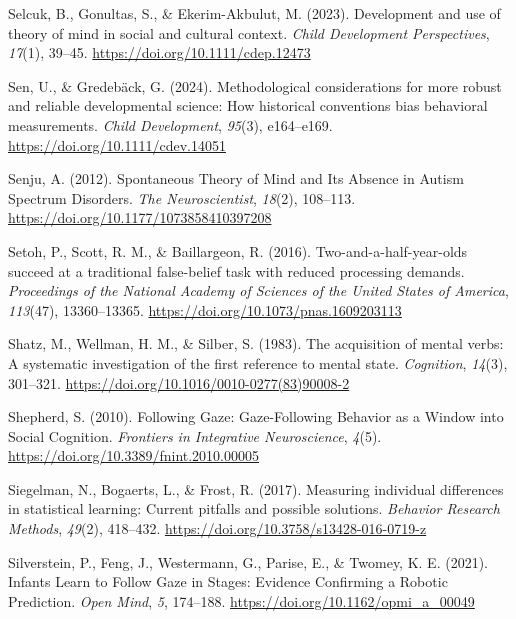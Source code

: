\documentclass[
]{scrbook}
\newlength{\cslhangindent}
\newenvironment{CSLReferences}[2] %
 {\begin{list}{}{%
  \setlength{\itemindent}{0pt}
  \setlength{\leftmargin}{0pt}
  \setlength{\parsep}{0pt}
  \ifodd #1
   \setlength{\leftmargin}{\cslhangindent}
   \setlength{\itemindent}{-1\cslhangindent}
  \fi
  \setlength{\itemsep}{#2\baselineskip}}}
 {\end{list}}
\begin{document}
\begin{CSLReferences}{1}{0}
Selcuk, B., Gonultas, S., \& Ekerim-Akbulut, M. (2023). Development and use of theory of mind in social and cultural context. \emph{Child Development Perspectives}, \emph{17}(1), 39--45. \url{https://doi.org/10.1111/cdep.12473}

Sen, U., \& Gredebäck, G. (2024). Methodological considerations for more robust and reliable developmental science: {How} historical conventions bias behavioral measurements. \emph{Child Development}, \emph{95}(3), e164--e169. \url{https://doi.org/10.1111/cdev.14051}

Senju, A. (2012). Spontaneous {Theory} of {Mind} and {Its Absence} in {Autism Spectrum Disorders}. \emph{The Neuroscientist}, \emph{18}(2), 108--113. \url{https://doi.org/10.1177/1073858410397208}

Setoh, P., Scott, R. M., \& Baillargeon, R. (2016). Two-and-a-half-year-olds succeed at a traditional false-belief task with reduced processing demands. \emph{Proceedings of the National Academy of Sciences of the United States of America}, \emph{113}(47), 13360--13365. \url{https://doi.org/10.1073/pnas.1609203113}

Shatz, M., Wellman, H. M., \& Silber, S. (1983). The acquisition of mental verbs: {A} systematic investigation of the first reference to mental state. \emph{Cognition}, \emph{14}(3), 301--321. \url{https://doi.org/10.1016/0010-0277(83)90008-2}

Shepherd, S. (2010). Following {Gaze}: {Gaze-Following Behavior} as a {Window} into {Social Cognition}. \emph{Frontiers in Integrative Neuroscience}, \emph{4}(5). \url{https://doi.org/10.3389/fnint.2010.00005}

Siegelman, N., Bogaerts, L., \& Frost, R. (2017). Measuring individual differences in statistical learning: {Current} pitfalls and possible solutions. \emph{Behavior Research Methods}, \emph{49}(2), 418--432. \url{https://doi.org/10.3758/s13428-016-0719-z}

Silverstein, P., Feng, J., Westermann, G., Parise, E., \& Twomey, K. E. (2021). Infants {Learn} to {Follow Gaze} in {Stages}: {Evidence Confirming} a {Robotic Prediction}. \emph{Open Mind}, \emph{5}, 174--188. \url{https://doi.org/10.1162/opmi_a_00049}


\end{CSLReferences}
\end{document}

